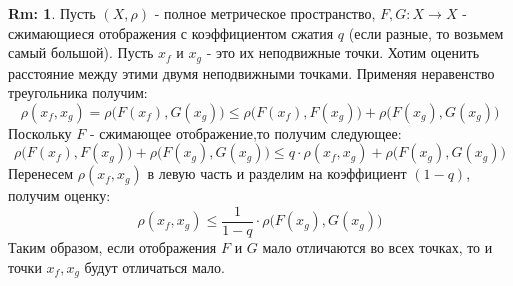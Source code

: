 \documentclass[12pt]{article}
\theoremstyle{definition}
\newtheorem{rem}{Rm:}
\begin{document}
\begin{rem}
	Пусть $(X,\rho)$ - полное метрическое пространство, $F, G\colon X \to X$ - сжимающиеся отображения с коэффициентом сжатия $q$ (если разные, то возьмем самый большой). Пусть $x_f$ и $x_g$ - это их неподвижные точки. Хотим оценить расстояние между этими двумя неподвижными точками. Применяя неравенство треугольника получим:
	$$
		\rho(x_f,x_g) = \rho\big(F(x_f),G(x_g) \big) \leq \rho\big(F(x_f),F(x_g)\big) + \rho\big(F(x_g),G(x_g) \big)
	$$
	Поскольку $F$ - сжимающее отображение,то получим следующее:
	$$
		\rho\big(F(x_f),F(x_g)\big) + \rho\big(F(x_g),G(x_g) \big) \leq q{\cdot}\rho(x_f,x_g) + \rho\big(F(x_g),G(x_g)\big)
	$$
	Перенесем $\rho(x_f,x_g)$ в левую часть и разделим на коэффициент $(1-q)$, получим оценку:
	$$
		\rho(x_f,x_g) \leq \dfrac{1}{1-q}{\cdot}\rho\big(F(x_g),G(x_g) \big)
	$$
	Таким образом, если отображения $F$ и $G$ мало отличаются во всех точках, то и точки $x_f, x_g$ будут отличаться мало.
\end{rem}
\end{document}
